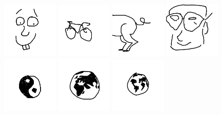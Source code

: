 

\includegraphics[width=0.2\textwidth]{art/Safari.png}
\includegraphics[width=0.2\textwidth]{art/Safari_10.png}
\includegraphics[width=0.2\textwidth]{art/Safari_11.png}
\includegraphics[width=0.2\textwidth]{art/Safari_12.png}
\includegraphics[width=0.2\textwidth]{art/Safari_13.png}
\includegraphics[width=0.2\textwidth]{art/Safari_14.png}
\includegraphics[width=0.2\textwidth]{art/Safari_15.png}
